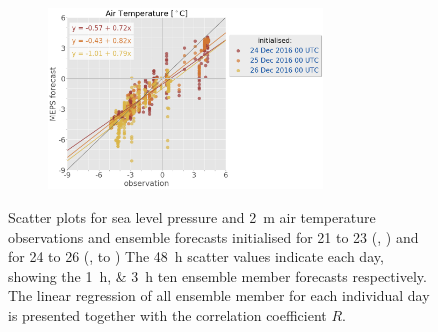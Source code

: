 \begin{figure}[H]
\begin{subfigure}[b]{0.49\textwidth}
		\centering
		\includegraphics[trim={25.cm 15.5cm 0cm 3.6cm},clip,
		width=0.8\textwidth]{./fig_sfc_temp/obs_model_20161224_26_00_label}
	\end{subfigure}
	\caption{Scatter plots for sea level pressure and \SI{2}{\metre} air temperature observations and ensemble forecasts initialised for \num{21} to \SI{23}{\dec} (\protect{}, \protect{})
		and  for \num{24} to \SI{26}{\dec} (\protect{}, to \protect{})
		The \SI{48}{\hour} scatter values indicate each day, showing the \SIlist{1;3}{\hour} ten ensemble member forecasts respectively. The linear regression of all ensemble member for each individual day is presented together with the correlation coefficient $R$. %
	}\label{fig:scat:SLP_T}
\end{figure}
